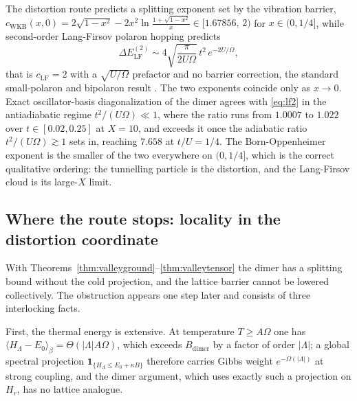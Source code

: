 \documentclass[11pt]{article}
\theoremstyle{definition}
\theoremstyle{remark}
\begin{document}
The distortion route predicts a splitting exponent set by the vibration barrier,
$c_{\mathrm{WKB}}(x,0)=2\sqrt{1-x^{2}}-2x^{2}\ln\frac{1+\sqrt{1-x^{2}}}{x}\in
[1.67856,\,2)$ for $x\in(0,1/4]$, while second-order Lang-Firsov polaron hopping
predicts
\begin{equation}
\Delta E_{\mathrm{LF}}^{(2)}\sim4\sqrt{\frac{\pi}{2U\Omega}}\,t^{2}\,
e^{-2U/\Omega},
\label{eq:lf2}
\end{equation}
that is $c_{\mathrm{LF}}=2$ with a $\sqrt{U/\Omega}$ prefactor and no barrier
correction, the standard small-polaron and bipolaron result
\cite{langfirsov,devreese2009}. The two exponents coincide only as $x\to0$. Exact oscillator-basis
diagonalization of the dimer agrees with \eqref{eq:lf2} in the antiadiabatic
regime $t^{2}/(U\Omega)\ll1$, where the ratio runs from $1.0007$ to $1.022$ over
$t\in[0.02,0.25]$ at $X=10$, and exceeds it once the adiabatic ratio
$t^{2}/(U\Omega)\gtrsim1$ sets in, reaching $7.658$ at $t/U=1/4$. The
Born-Oppenheimer exponent is the smaller of the two everywhere on $(0,1/4]$, which
is the correct qualitative ordering: the tunnelling particle is the distortion,
and the Lang-Firsov cloud is its large-$X$ limit.

\subsection{Where the route stops: locality in the distortion coordinate}

With Theorems~\ref{thm:valleyground}--\ref{thm:valleytensor} the dimer has a
splitting bound without the cold projection, and the lattice barrier cannot be
lowered collectively. The obstruction appears one step later and consists of three
interlocking facts.

First, the thermal energy is extensive. At temperature $T\ge A\Omega$ one has
$\langle H_{\Lambda}-E_{0}\rangle_{\beta}=\Theta(|\Lambda|A\Omega)$, which exceeds
$B_{\mathrm{dimer}}$ by a factor of order $|\Lambda|$; a global spectral
projection $\mathbf{1}_{\{H_{\Lambda}\le E_{0}+\kappa B\}}$ therefore carries
Gibbs weight $e^{-\Omega(|\Lambda|)}$ at strong coupling, and the dimer argument,
which uses exactly such a projection on $H_{r}$, has no lattice analogue.
\end{document}
